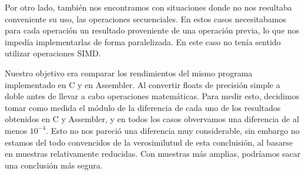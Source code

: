 Por otro lado, también nos encontramos con situaciones donde no nos resultaba conveniente su uso, las operaciones secuenciales.
En estos casos necesitabamos para cada operación un resultado proveniente de una operación previa, lo que nos impedía implementarlas de forma paralelizada. En este caso no tenía sentido utilizar operaciones SIMD.

\par
Nuestro objetivo era comparar los rendimientos del mismo programa implementado en C  y en Assembler.
Al convertir floats de precisión simple a doble antes de llevar a cabo operaciones matemáticas.
Para medir esto, decidimos tomar como medida el módulo de la diferencia de cada uno de los resultados obtenidos en C y Assembler, y en todos los casos obvervamos una diferencia de al menos $10^{-4}$. Esto no nos pareció una diferencia muy considerable, sin embargo no estamos del todo convencidos de la verosimilutud de esta concluisión, al basarse en muestras relativamente reducidas. Con muestras más amplias, podríamos sacar una conclusión más segura.
